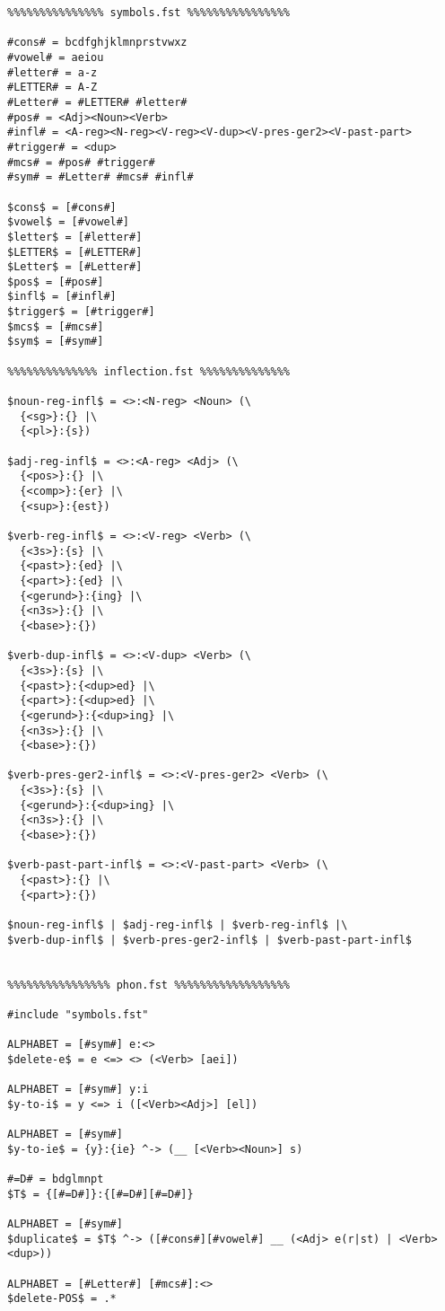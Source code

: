 \documentclass[11pt]{article}
\begin{document}
\begin{verbatim}
%%%%%%%%%%%%%%% symbols.fst %%%%%%%%%%%%%%%%

#cons# = bcdfghjklmnprstvwxz
#vowel# = aeiou
#letter# = a-z
#LETTER# = A-Z
#Letter# = #LETTER# #letter#
#pos# = <Adj><Noun><Verb>
#infl# = <A-reg><N-reg><V-reg><V-dup><V-pres-ger2><V-past-part>
#trigger# = <dup>
#mcs# = #pos# #trigger#
#sym# = #Letter# #mcs# #infl#

$cons$ = [#cons#]
$vowel$ = [#vowel#]
$letter$ = [#letter#]
$LETTER$ = [#LETTER#]
$Letter$ = [#Letter#]
$pos$ = [#pos#]
$infl$ = [#infl#]
$trigger$ = [#trigger#]
$mcs$ = [#mcs#]
$sym$ = [#sym#]

%%%%%%%%%%%%%% inflection.fst %%%%%%%%%%%%%%

$noun-reg-infl$ = <>:<N-reg> <Noun> (\
  {<sg>}:{} |\
  {<pl>}:{s})

$adj-reg-infl$ = <>:<A-reg> <Adj> (\
  {<pos>}:{} |\
  {<comp>}:{er} |\
  {<sup>}:{est})

$verb-reg-infl$ = <>:<V-reg> <Verb> (\
  {<3s>}:{s} |\
  {<past>}:{ed} |\
  {<part>}:{ed} |\
  {<gerund>}:{ing} |\
  {<n3s>}:{} |\
  {<base>}:{})

$verb-dup-infl$ = <>:<V-dup> <Verb> (\
  {<3s>}:{s} |\
  {<past>}:{<dup>ed} |\
  {<part>}:{<dup>ed} |\
  {<gerund>}:{<dup>ing} |\
  {<n3s>}:{} |\
  {<base>}:{})

$verb-pres-ger2-infl$ = <>:<V-pres-ger2> <Verb> (\
  {<3s>}:{s} |\
  {<gerund>}:{<dup>ing} |\
  {<n3s>}:{} |\
  {<base>}:{})

$verb-past-part-infl$ = <>:<V-past-part> <Verb> (\
  {<past>}:{} |\
  {<part>}:{})

$noun-reg-infl$ | $adj-reg-infl$ | $verb-reg-infl$ |\
$verb-dup-infl$ | $verb-pres-ger2-infl$ | $verb-past-part-infl$


%%%%%%%%%%%%%%%% phon.fst %%%%%%%%%%%%%%%%%%

#include "symbols.fst"

ALPHABET = [#sym#] e:<>
$delete-e$ = e <=> <> (<Verb> [aei])

ALPHABET = [#sym#] y:i
$y-to-i$ = y <=> i ([<Verb><Adj>] [el])

ALPHABET = [#sym#]
$y-to-ie$ = {y}:{ie} ^-> (__ [<Verb><Noun>] s)

#=D# = bdglmnpt
$T$ = {[#=D#]}:{[#=D#][#=D#]}

ALPHABET = [#sym#]
$duplicate$ = $T$ ^-> ([#cons#][#vowel#] __ (<Adj> e(r|st) | <Verb><dup>))

ALPHABET = [#Letter#] [#mcs#]:<>
$delete-POS$ = .*


\end{verbatim}
\end{document}
